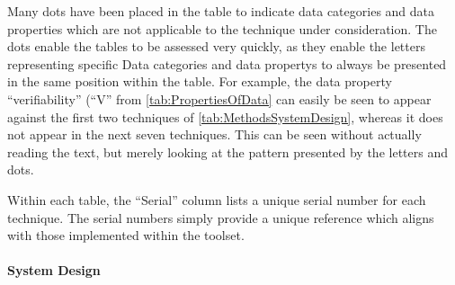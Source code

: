 Many dots have been placed in the table to indicate data categories and data properties which are not applicable to the technique under consideration. The dots enable the tables to be assessed very quickly, as they enable the letters representing specific Data categories and \glspl{data property} to always be presented in the same position within the table. For example, the \gls{data property} ``\gls{verifiability}'' (``V'' from \autoref{tab:PropertiesOfData} can easily be seen to appear against the first two techniques of \autoref{tab:MethodsSystemDesign}, whereas it does not appear in the next seven techniques. This can be seen without actually reading the text, but merely looking at the pattern presented by the letters and dots. 

Within each table, the ``Serial'' column lists a unique serial number for each technique. The serial numbers simply provide a unique reference which aligns with those implemented within the toolset.

\paragraph{System Design}

